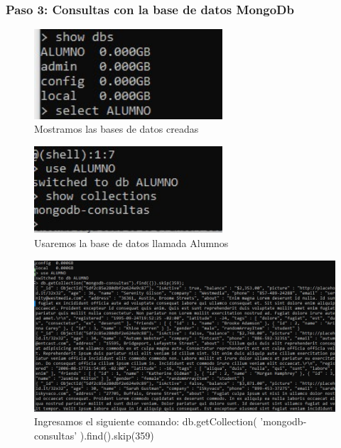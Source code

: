 \documentclass[preprint,12pt]{elsarticle}
\begin{document}
\subsubsection{\textbf{Paso 3: Consultas con la base de datos MongoDb}}

\begin{figure}[H]
	\begin{center}
		\includegraphics[width=07cm]{./IMAGENES/foto7} 
		\caption{Mostramos las bases de datos creadas}
	\end{center}
\end{figure}

\begin{figure}[H]
	\begin{center}
		\includegraphics[width=07cm]{./IMAGENES/foto8} 
		\caption{Usaremos la base de datos llamada Alumnos}
	\end{center}
\end{figure}

\begin{figure}[H]
	\begin{center}
		\includegraphics[width=12cm]{./IMAGENES/foto9} 
		\caption{Ingresamos el siguiente comando: db.getCollection( 'mongodb-consultas' ).find().skip(359)}
	\end{center}
\end{figure}
\end{document}

